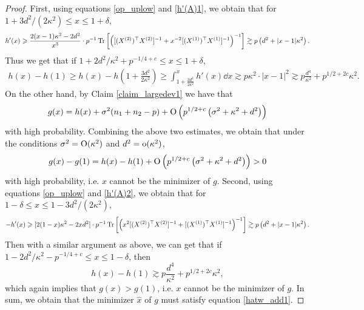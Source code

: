 \begin{proof}
First, using equations \eqref{op_uplow} and  \eqref{h'(A)1}, we obtain that for $1+3d^2/(2\kappa^2) \le x\le 1+\delta$,
$$h'(x)\geqslant \frac{2(x-1)\kappa^2 - 2d^2}{x^3} \cdot p^{-1} \operatorname{Tr}\left[\left([(X^{(2)})^\top X^{(2)}]^{-1} + x^{-2} [(X^{(1)})^\top X^{(1)}]^{-1}\right)^{-1}\right] \gtrsim p\left(d^2 + |x-1|\kappa^2\right).$$
Thus we get that if $1+2d^2/\kappa^2 +p^{-1/4+c}\le x\le 1+\delta$,
\begin{align*}
h(x)-h(1)\ge h(x)-h\left(1+\frac{3d^2}{2\kappa^2}\right) \ge \int_{1+\frac{3d^2}{2\kappa^2}}^x h'(x)\dd x \gtrsim p\kappa^2 \cdot |x-1|^2  \gtrsim p\frac{d^4}{\kappa^2} + p^{1/2+2c} \kappa^2 .
\end{align*}
On the other hand, by Claim \ref{claim_largedev1} we have that
$$ g(x)=h(x)+\sigma^2 (n_1+n_2-p)+\operatorname{O} \left(p^{1/2+c}\left(\sigma^2 +\kappa^2+d^2 \right)\right)$$
with high probability. Combining the above two estimates, we obtain that under the conditions $\sigma^2 =\operatorname{O}( \kappa^2)$ and $d^2 =\operatorname{o}({\kappa^2})$,
$$g(x)-g(1) = h(x)-h(1) + \operatorname{O} \left(p^{1/2+c}\left(\sigma^2 +\kappa^2+d^2 \right)\right) >0$$
with high probability, i.e. $x$ cannot be the minimizer of $g$.
Second, using equations \eqref{op_uplow} and  \eqref{h'(A)2}, we obtain that for $1-\delta \le x \le 1-3d^2/(2\kappa^2)$,
$$- h'(x)\geqslant  [2(1-x)\kappa^2 - 2xd^2] \cdot p^{-1} \operatorname{Tr}\left[\left(x^2[(X^{(2)})^\top X^{(2)}]^{-1} + [(X^{(1)})^\top X^{(1)}]^{-1}\right)^{-1}\right]  \gtrsim p\left(d^2 + |x-1|\kappa^2\right).$$
Then with a similar argument as above, we can get that if $1-2d^2/\kappa^2 - p^{-1/4+c}\le x\le 1-\delta$, then
$$ h(x)-h(1) \gtrsim p\frac{d^4}{\kappa^2} +p^{1/2+2c} \kappa^2, $$
which again implies that $g(x)>g(1)$, i.e. $x$ cannot be the minimizer of $g$. In sum, we obtain that the minimizer $\hat x$ of $g$ must satisfy equation \eqref{hatw_add1}.

\end{proof}
